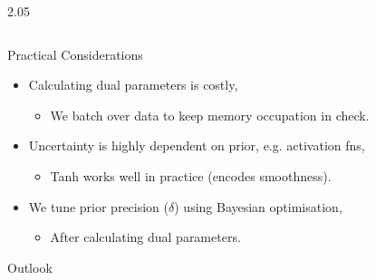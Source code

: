 \documentclass[final,12pt]{beamer}
\newlength{\colwidth}
\begin{document}
\begin{frame}[t]
\begin{columns}[t]
\begin{column}{2.05\colwidth}
\begin{columns}[t]
\begin{column}{\colwidth}
\begin{block}{Practical Considerations}
  \begin{itemize}
     \item Calculating dual parameters is costly,
    \begin{itemize}
        \item We batch over data to keep memory occupation in check.
    \end{itemize}
     \item Uncertainty is highly dependent on prior, e.g. activation fns,
    \begin{itemize}
        \item Tanh works well in practice (encodes smoothness).
    \end{itemize}
     \item We tune prior precision ($\delta$) using Bayesian optimisation,
    \begin{itemize}
        \item After calculating dual parameters.
    \end{itemize}
   \end{itemize}

  \end{block}

  \begin{block}{Outlook}



\end{block}
\end{column}
\end{columns}
\end{column}
\end{columns}
\end{frame}
\end{document}
